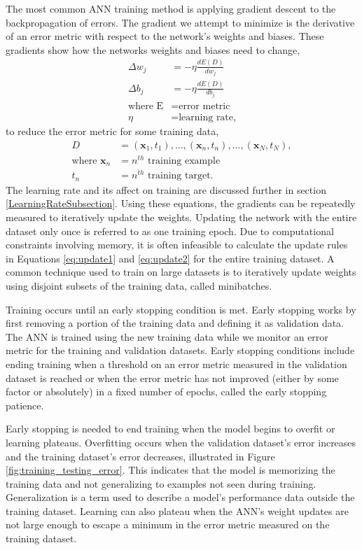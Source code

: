 The most common ANN training method is applying gradient descent to the backpropagation of errors. The gradient we attempt to minimize is the derivative of an error metric with respect to the network's weights and biases. These gradients show how the networks weights and biases need to change,
%
\begin{align}
\Delta w_{j} &= - \eta \frac{dE(D)}{dw_j} \label{eq:update1} \\
\Delta b_{j} &= - \eta \frac{dE(D)}{db_j} \label{eq:update2} \\
\text{where E} &= \text{error metric} \nonumber \\
\eta &= \text{learning rate,} \nonumber
\end{align}
to reduce the error metric for some training data,
%
\begin{align} \label{eq:train_data_D}
D&={(\boldsymbol{x}_1,t_1), ... , (\boldsymbol{x}_n,t_n), ... , (\boldsymbol{x}_N,t_N)}, \\
\text{where } \boldsymbol{x}_{n} &= n^{th} \text{ training example} \nonumber \\
t_n &= n^{th} \text{ training target.} \nonumber
\end{align}
%
The learning rate and its affect on training are discussed further in section \ref{LearningRateSubsection}. Using these equations, the gradients can be repeatedly measured to iteratively update the weights. Updating the network with the entire dataset only once is referred to as one training epoch. Due to computational constraints involving memory, it is often infeasible to calculate the update rules in Equations \ref{eq:update1} and \ref{eq:update2} for the entire training dataset. A common technique used to train on large datasets is to iteratively update weights using disjoint subsets of the training data, called minibatches.

Training occurs until an early stopping condition is met. Early stopping works by first removing a portion of the training data and defining it as validation data. The ANN is trained using the new training data while we monitor an error metric for the training and validation datasets. Early stopping conditions include ending training when a threshold on an error metric measured in the validation dataset is reached or when the error metric has not improved (either by some factor or absolutely) in a fixed number of epochs, called the early stopping patience. 

Early stopping is needed to end training when the model begins to overfit or learning plateaus. Overfitting occurs when the validation dataset's error increases and the training dataset's error decreases, illustrated in Figure \ref{fig:training_testing_error}. This indicates that the model is memorizing the training data and not generalizing to examples not seen during training. Generalization is a term used to describe a model's performance data outside the training dataset. Learning can also plateau when the ANN's weight updates are not large enough to escape a minimum in the error metric measured on the training dataset.

